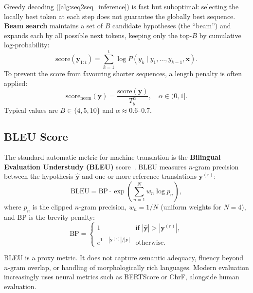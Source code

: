 \documentclass[12pt,a4paper]{article}
\begin{document}
Greedy decoding (\cref{alg:seq2seq_inference}) is fast but suboptimal: selecting the locally
best token at each step does not guarantee the globally best sequence. \textbf{Beam search}
maintains a set of $B$ candidate hypotheses (the ``beam'') and expands each by all possible
next tokens, keeping only the top-$B$ by cumulative log-probability:
\begin{equation}
  \text{score}(\mathbf{y}_{1:t}) = \sum_{k=1}^{t} \log P(y_k \mid y_1, \ldots, y_{k-1}, \mathbf{x}).
  \label{eq:beam_score}
\end{equation}
To prevent the score from favouring shorter sequences, a length penalty is often applied:
\begin{equation}
  \text{score}_{\text{norm}}(\mathbf{y}) = \frac{\text{score}(\mathbf{y})}{T_y^\alpha},
  \quad \alpha \in (0, 1].
  \label{eq:length_penalty}
\end{equation}
Typical values are $B \in \{4, 5, 10\}$ and $\alpha \approx 0.6$--$0.7$.

\subsection{BLEU Score}

The standard automatic metric for machine translation is the
\textbf{Bilingual Evaluation Understudy (BLEU)} score~\cite{papineni2002}.
BLEU measures $n$-gram precision between the hypothesis $\hat{\mathbf{y}}$ and one or more
reference translations $\mathbf{y}^{(r)}$:
\begin{equation}
  \text{BLEU} = \text{BP} \cdot \exp\!\left(\sum_{n=1}^{N} w_n \log p_n\right),
  \label{eq:bleu}
\end{equation}
where $p_n$ is the clipped $n$-gram precision, $w_n = 1/N$ (uniform weights for $N=4$), and
$\text{BP}$ is the brevity penalty:
\begin{equation}
  \text{BP} = \begin{cases} 1 & \text{if } |\hat{\mathbf{y}}| > |\mathbf{y}^{(r)}|, \\
                            e^{1 - |\mathbf{y}^{(r)}|/|\hat{\mathbf{y}}|} & \text{otherwise.}
              \end{cases}
  \label{eq:bp}
\end{equation}

\begin{warningbox}[title={BLEU Limitations}]
  BLEU is a proxy metric. It does not capture semantic adequacy, fluency beyond $n$-gram
  overlap, or handling of morphologically rich languages. Modern evaluation increasingly
  uses neural metrics such as BERTScore or ChrF, alongside human evaluation.
\end{warningbox}
\end{document}

